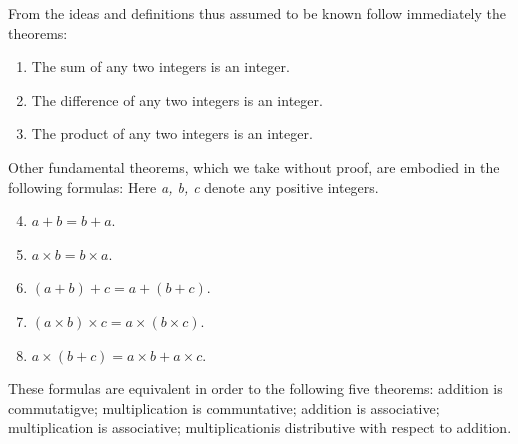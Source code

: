 \documentclass[oneside,12pt]{book}
\begin{document}
From the ideas and definitions thus assumed to be known follow immediately the theorems:
\begin{singlespace}
\renewcommand{\labelenumi}{\Roman{enumi}.}
\begin{enumerate}
    \item The sum of any two integers is an integer.
    \item The difference of any two integers is an integer.
    \item The product of any two integers is an integer.
\end{enumerate} \par 
\end{singlespace}
Other fundamental theorems, which we take without proof, are embodied in the following formulas: Here \textit{a, b, c} denote any positive integers. \par 
\renewcommand{\labelenumi}{\Roman{enumi}.}
\begin{enumerate}
    \setcounter{enumi}{3}
    \item \hspace{1cm}$a+b=b+a$.
    \item \hspace{1cm}$a\times b=b\times a$.
    \item $(a+b)+c=a+(b+c)$.
    \item $(a\times b)\times c=a\times(b\times c)$.
    \item $a\times(b+c)=a\times b+a\times c$.
\end{enumerate} \par 

These formulas are equivalent in order to the following five theorems: addition is commutatigve; multiplication is communtative; addition is associative; multiplication is associative; multiplicationis distributive with respect to addition. \par 
\end{document}
